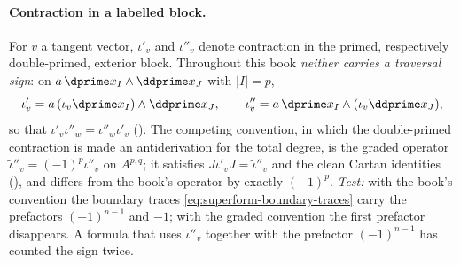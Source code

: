 \paragraph{Contraction in a labelled block.}
\label{sec:appJ-contraction}
For \(v\) a tangent vector, \(\iota'_v\) and \(\iota''_v\) denote contraction in
the primed, respectively double-primed, exterior block.  Throughout this book
\emph{neither carries a traversal sign}: on
\(a\,\dprime x_I\wedge\ddprime x_J\) with \(|I|=p\),
\[
 \iota'_v=a\,(\iota_v\dprime x_I)\wedge\ddprime x_J,
 \qquad
 \iota''_v=a\,\dprime x_I\wedge(\iota_v\ddprime x_J),
\]
so that \(\iota'_v\iota''_w=\iota''_w\iota'_v\)
().  The competing
convention, in which the double-primed contraction is made an antiderivation
for the total degree, is the graded operator
\(\widetilde\iota''_v=(-1)^p\iota''_v\) on \(A^{p,q}\); it satisfies
\(J\iota'_vJ=\widetilde\iota''_v\) and the clean Cartan identities
(), and differs from the
book's operator by exactly \((-1)^p\).  \emph{Test:} with the book's
convention the boundary traces \eqref{eq:superform-boundary-traces} carry the
prefactors \((-1)^{n-1}\) and \(-1\); with the graded convention the first
prefactor disappears.  A formula that uses \(\widetilde\iota''_v\) together
with the prefactor \((-1)^{n-1}\) has counted the sign twice.

